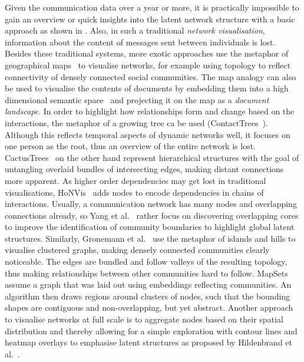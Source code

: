 Given the communication data over a year or more, it is practically impossible to gain an overview or quick insights into the latent network structure with a basic approach as shown in .
Also, in such a traditional \textit{network visualisation}, information about the content of messages sent between individuals is lost.
Besides these traditional systems, more exotic approaches use the metaphor of geographical maps~\cite{pang2017creating} to visualise networks, for example using topology to reflect connectivity of densely connected social communities.
The map analogy can also be used to visualise the contents of documents by embedding them into a high dimensional semantic space~\cite{le2014distributed} and projecting it on the map as a \textit{document landscape}.
In order to highlight how relationships form and change based on the interactions, the metaphor of a growing tree ca be used (ContactTrees~\cite{sallaberry2016contact}).
Although this reflects temporal aspects of dynamic networks well, it focuses on one person as the root, thus an overview of the entire network is lost.
CactusTrees~\cite{dang2017cactustree} on the other hand represent hierarchical structures with the goal of untangling overlaid bundles of intersecting edges, making distant connections more apparent.
As higher order dependencies may get lost in traditional visualisations, HoNVis~\cite{tao2017honvis} adds nodes to encode dependencies in chains of interactions.
Usually, a communication network has many nodes and overlapping connections already, so Yang et al.~\cite{yang2014overlapping} rather focus on discovering overlapping cores to improve the identification of community boundaries to highlight global latent structures.
Similarly, Gronemann et al.~\cite{gronemann2012drawing} use the metaphor of islands and hills to visualise clustered graphs, making densely connected communities clearly noticeable.
The edges are bundled and follow valleys of the resulting topology, thus making relationships between other communities hard to follow.
MapSets~\cite{efrat2015mapsets} assume a graph that was laid out using embeddings reflecting communities.
An algorithm then draws regions around clusters of nodes, such that the bounding shapes are contiguous and non-overlapping, but yet abstract.
Another approach to visualise networks at full scale is to aggregate nodes based on their spatial distribution and thereby allowing for a simple exploration with contour lines and heatmap overlays to emphasise latent structures as proposed by Hildenbrand et al.~\cite{hildenbrand2016flexible}.

